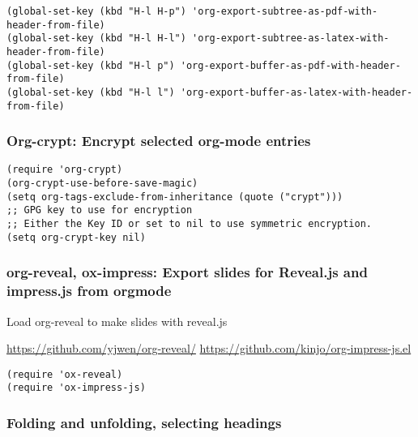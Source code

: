 \documentclass{article}
\begin{document}
\begin{enumerate}
\begin{enumerate}
\begin{verbatim}
(global-set-key (kbd "H-l H-p") 'org-export-subtree-as-pdf-with-header-from-file)
(global-set-key (kbd "H-l H-l") 'org-export-subtree-as-latex-with-header-from-file)
(global-set-key (kbd "H-l p") 'org-export-buffer-as-pdf-with-header-from-file)
(global-set-key (kbd "H-l l") 'org-export-buffer-as-latex-with-header-from-file)
\end{verbatim}
\end{enumerate}
\end{enumerate}


\subsubsection{Org-crypt: Encrypt selected org-mode entries}
\label{sec-2-5-12}

\begin{verbatim}
(require 'org-crypt)
(org-crypt-use-before-save-magic)
(setq org-tags-exclude-from-inheritance (quote ("crypt")))
;; GPG key to use for encryption
;; Either the Key ID or set to nil to use symmetric encryption.
(setq org-crypt-key nil)
\end{verbatim}

\subsubsection{org-reveal, ox-impress: Export slides for Reveal.js and impress.js from orgmode}
\label{sec-2-5-13}

Load org-reveal to make slides with reveal.js

\url{https://github.com/yjwen/org-reveal/}
\url{https://github.com/kinjo/org-impress-js.el}

\begin{verbatim}
(require 'ox-reveal)
(require 'ox-impress-js)
\end{verbatim}

\subsubsection{Folding and unfolding, selecting headings}
\label{sec-2-5-14}
\end{document}
